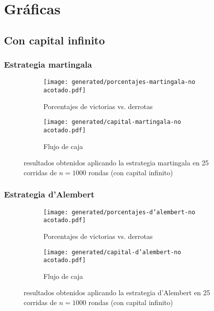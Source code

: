 \documentclass{article}
\begin{document}
  
  \section{Gráficas}
  \subsection{Con capital infinito}
  \subsubsection{Estrategia martingala}
  \begin{figure}[H]
    \centering
    \begin{subfigure}{0.5\textwidth}
      \centering
      \texttt{[image: generated/porcentajes-martingala-no acotado.pdf]}
      \caption{Porcentajes de victorias vs. derrotas}
    \end{subfigure}%
	\begin{subfigure}{0.5\textwidth}
	  \centering
      \texttt{[image: generated/capital-martingala-no acotado.pdf]}
	  \caption{Flujo de caja}
	\end{subfigure}
	\caption{resultados obtenidos aplicando la estrategia martingala en 25 corridas de $n = 1000$ rondas (con capital infinito)}
  \end{figure}

  \subsubsection{Estrategia d’Alembert}
  \begin{figure}[H]
    \centering
    \begin{subfigure}{0.5\textwidth}
      \centering
      \texttt{[image: generated/porcentajes-d'alembert-no acotado.pdf]}
      \caption{Porcentajes de victorias vs. derrotas}
    \end{subfigure}%
    \begin{subfigure}{0.5\textwidth}
      \centering
      \texttt{[image: generated/capital-d'alembert-no acotado.pdf]}
      \caption{Flujo de caja}
    \end{subfigure}
    \caption{resultados obtenidos aplicando la estrategia d’Alembert en 25 corridas de $n = 1000$ rondas (con capital infinito)}
  \end{figure}
\end{document}
